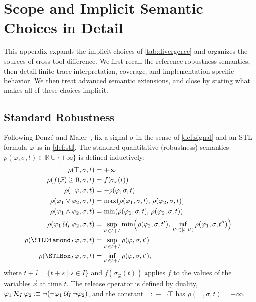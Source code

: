 \section{Scope and Implicit Semantic Choices in Detail}
\label{sec:formal}

This appendix expands the implicit choices of
\cref{tab:divergence} and organizes the sources of cross-tool
difference. We first recall the reference robustness semantics, then detail
finite-trace interpretation, coverage, and implementation-specific behavior.
We then treat advanced semantic extensions, and close by stating what makes all
of these choices implicit.

\subsection{Standard Robustness}

Following Donz\'e and Maler~\cite{donze2010robust}, fix a signal
$\sigma$ in the sense of \cref{def:signal} and an STL formula
$\varphi$ as in \cref{def:stl}. The standard quantitative
(robustness) semantics
$\rho(\varphi, \sigma, t) \in \mathbb{R} \cup \{\pm\infty\}$ is defined
inductively:
\begin{align*}
  \rho(\top,\sigma,t) &= +\infty \\
  \rho(f(\vec{x}) \geq 0,\sigma,t) &= f(\sigma_{\vec{x}}(t)) \\
  \rho(\neg\varphi,\sigma,t) &= -\rho(\varphi,\sigma,t) \\
  \rho(\varphi_1 \vee \varphi_2, \sigma, t) &= \max(\rho(\varphi_1,\sigma,t),\,\rho(\varphi_2,\sigma,t)) \\
  \rho(\varphi_1 \wedge \varphi_2, \sigma, t) &= \min(\rho(\varphi_1,\sigma,t),\,\rho(\varphi_2,\sigma,t)) \\
  \rho(\varphi_1 \Until_I \varphi_2, \sigma, t) &= \sup_{t' \in t + I} \min\Bigl(\rho(\varphi_2,\sigma,t'),\, \inf_{t'' \in [t,\,t')} \rho(\varphi_1,\sigma,t'')\Bigr) \\
  \rho(\Eventually_I\varphi, \sigma, t) &= \sup_{t' \in t + I} \rho(\varphi,\sigma,t') \\
  \rho(\Always_I\varphi, \sigma, t) &= \inf_{t' \in t + I} \rho(\varphi,\sigma,t'),
\end{align*}
where $t + I = \{t + s \mid s \in I\}$ and $f(\sigma_{\vec{x}}(t))$ applies
$f$ to the values of the variables $\vec{x}$ at time $t$. The release
operator is defined by duality,
$\varphi_1 \mathbin{\mathcal{R}}_I \varphi_2 :\equiv
 \neg(\neg\varphi_1 \mathbin{\mathcal{U}}_I \neg\varphi_2)$,
and the constant $\bot :\equiv \neg\top$ has
$\rho(\bot,\sigma,t) = -\infty$.

